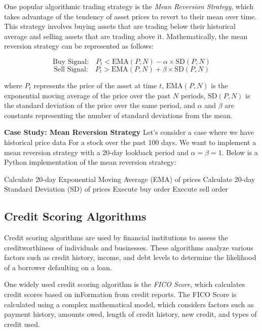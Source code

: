 \documentclass[12pt]{book} %
\begin{document}
One popular algorithmic trading strategy is the \textit{Mean Reversion Strategy}, which takes advantage of the tendency of asset prices to revert to their mean over time. This strategy involves buying assets that are trading below their historical average and selling assets that are trading above it. Mathematically, the mean reversion strategy can be represented as follows:

\[
\text{Buy Signal:} \quad P_t < \text{EMA}(P, N) - \alpha \times \text{SD}(P, N)
\]
\[
\text{Sell Signal:} \quad P_t > \text{EMA}(P, N) + \beta \times \text{SD}(P, N)
\]

where $P_t$ represents the price of the asset at time $t$, $\text{EMA}(P, N)$ is the exponential moving average of the price over the past $N$ periods, $\text{SD}(P, N)$ is the standard deviation of the price over the same period, and $\alpha$ and $\beta$ are constants representing the number of standard deviations from the mean.

\textbf{Case Study: Mean Reversion Strategy}
Let's consider a case where we have historical price data For a stock over the past 100 days. We want to implement a mean reversion strategy with a 20-day lookback period and $\alpha = \beta = 1$. Below is a Python implementation of the mean reversion strategy:
\FloatBarrier
\begin{algorithm}
\caption{Mean Reversion Strategy}
\begin{algorithmic}[1]
\State Calculate 20-day Exponential Moving Average (EMA) of prices
\State Calculate 20-day Standard Deviation (SD) of prices
\State Execute buy order
\State Execute sell order
\EndIf
\end{algorithmic}
\end{algorithm}
\FloatBarrier

\subsection{Credit Scoring Algorithms}
Credit scoring algorithms are used by financial institutions to assess the creditworthiness of individuals and businesses. These algorithms analyze various factors such as credit history, income, and debt levels to determine the likelihood of a borrower defaulting on a loan.

One widely used credit scoring algorithm is the \textit{FICO Score}, which calculates credit scores based on inFormation from credit reports. The FICO Score is calculated using a complex mathematical model, which considers factors such as payment history, amounts owed, length of credit history, new credit, and types of credit used.
\end{document}
